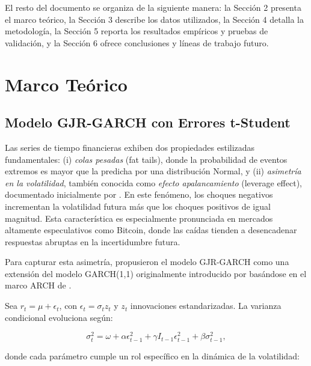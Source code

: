 \documentclass[
]{ceurart}
\begin{document}
El resto del documento se organiza de la siguiente manera: la Sección 2 presenta el marco teórico, la Sección 3 describe los datos utilizados, la Sección 4 detalla la metodología, la Sección 5 reporta los resultados empíricos y pruebas de validación, y la Sección 6 ofrece conclusiones y líneas de trabajo futuro.





\section{Marco Teórico}

\subsection{Modelo GJR-GARCH con Errores t-Student}

Las series de tiempo financieras exhiben dos propiedades estilizadas fundamentales:
(i) \textit{colas pesadas} (fat tails), donde la probabilidad de eventos extremos es mayor que la predicha por una distribución Normal, y
(ii) \textit{asimetría en la volatilidad}, también conocida como \textit{efecto apalancamiento} (leverage effect), documentado inicialmente por \cite{black1976}.
En este fenómeno, los choques negativos incrementan la volatilidad futura más que los choques positivos de igual magnitud. Esta característica es especialmente pronunciada en mercados altamente especulativos como Bitcoin, donde las caídas tienden a desencadenar respuestas abruptas en la incertidumbre futura.

Para capturar esta asimetría, \cite{glosten1993relation} propusieron el modelo GJR-GARCH como una extensión del modelo GARCH(1,1) originalmente introducido por \cite{bollerslev1986} basándose en el marco ARCH de \cite{engle1982}.

Sea $r_t = \mu + \epsilon_t$, con $\epsilon_t = \sigma_t z_t$ y $z_t$ innovaciones estandarizadas. La varianza condicional evoluciona según:

\begin{equation}
    \sigma_t^2 =
    \omega
    + \alpha \epsilon_{t-1}^2
    + \gamma I_{t-1}\epsilon_{t-1}^2
    + \beta \sigma_{t-1}^2,
\end{equation}

donde cada parámetro cumple un rol específico en la dinámica de la volatilidad:
\end{document}
